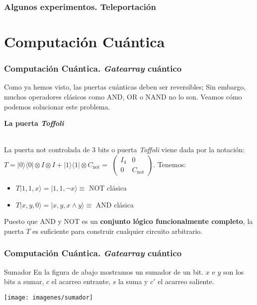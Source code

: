 \documentclass{beamer}
\newcommand{\base}[1]{|#1\rangle}
\newcommand{\lbase}[1]{\langle#1|}
\newcommand{\cnot}{C_{\mathrm{not}}}
\begin{document}
\begin{frame}
	\frametitle{Algunos experimentos. Teleportación}
		
\end{frame}

\section{Computación Cuántica}

\begin{frame}
	\frametitle{Computación Cuántica. \textit{Gatearray} cuántico}
	Como ya hemos visto, las puertas cuánticas deben ser reversibles; Sin embargo, muchos operadores clásicos como AND, OR o NAND no lo son. Veamos cómo podemos solucionar este problema.\newline
	
	\begin{Large}\textbf{La puerta \textit{Toffoli}}\end{Large}
	\newline\\
	La puerta not controlada de 3 bits o puerta \textit{Toffoli} viene dada por la notación:
	$T=\base0\lbase0\otimes I\otimes I +\base1\lbase1\otimes \cnot=$
	$\left({\begin{array}{c|c}	I_4&0\\\hline0&\cnot \end{array} } \right)$. Tenemos:
	
	\begin{itemize}
	\item $T\base{1,1,x}=\base{1,1,\neg x}\equiv$ NOT clásica
	\item $T\base{x,y,0}=\base{x,y,x\land y}\equiv$ AND clásica
	\end{itemize}
	Puesto que AND y NOT es un \textbf{conjunto lógico funcionalmente completo}, la puerta $T$ es suficiente para construir cualquier circuito arbitrario.
\end{frame}

\begin{frame}
	\frametitle{Computación Cuántica. \textit{Gatearray} cuántico}
	\begin{block}{Sumador}
	En la figura de abajo mostramos un sumador de un bit. $x$ e $y$ son los bits a sumar, $c$ el acarreo entrante, $s$ la suma y $c'$ el acarreo saliente.
	\end{block}
	\begin{center}
	\texttt{[image: imagenes/sumador]}
	\end{center}
\end{frame}
\end{document}
